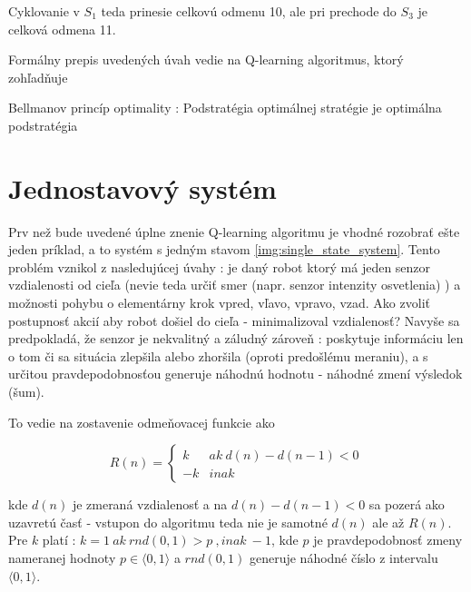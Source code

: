 Cyklovanie v $S_1$ teda prinesie celkovú odmenu 10, ale pri prechode do $S_3$ je celková
odmena 11.

Formálny prepis uvedených úvah vedie na Q-learning algoritmus, ktorý zohľadňuje

\begin{theorem}{Bellmanov princíp optimality : }
\label{post:00}
Podstratégia optimálnej stratégie je optimálna podstratégia
\end{theorem}

\section{Jednostavový systém}

Prv než bude uvedené úplne znenie Q-learning algoritmu je vhodné rozobrať ešte
jeden príklad, a to systém s jedným stavom \ref{img:single_state_system}.
Tento problém vznikol z nasledujúcej úvahy : je daný robot ktorý má jeden senzor
vzdialenosti od cieľa (nevie teda určiť smer (napr. senzor intenzity osvetlenia) ) a možnosti pohybu o elementárny krok
vpred, vľavo, vpravo, vzad. Ako zvoliť postupnosť akcií aby robot došiel do cieľa - minimalizoval vzdialenosť?
Navyše sa predpokladá, že senzor je nekvalitný a záludný zároveň : poskytuje
informáciu len o tom či sa situácia zlepšila alebo zhoršila (oproti predošlému meraniu),
a s určitou pravdepodobnosťou generuje náhodnú hodnotu - náhodné zmení výsledok (šum).

To vedie na zostavenie odmeňovacej funkcie ako

\begin{equation}
R(n) =
\left\{
	\begin{array}{ll}
		k  & ak \ d(n) - d(n-1) < 0 \\
    -k & inak
	\end{array}
\right.
\label{eq:q_nano_r_func_simple}
\end{equation}

kde $d(n)$ je zmeraná vzdialenosť a na $d(n) - d(n-1) < 0 $ sa pozerá
ako uzavretú časť - vstupon do algoritmu teda nie je samotné $d(n)$ ale až
$R(n)$. Pre $k$ platí : $k = 1 \ ak \ rnd(0, 1) > p \ , inak \ -1$, kde $p$ je pravdepodobnosť
zmeny nameranej hodnoty $p \in \langle 0, 1 \rangle $ a $rnd(0, 1)$ generuje náhodné
číslo z intervalu $\langle 0, 1 \rangle$.

